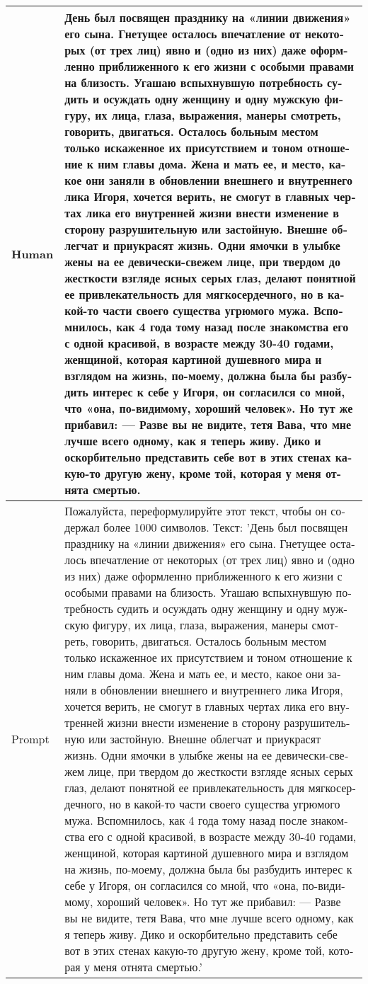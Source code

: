 \begin{center}
\begin{supertabular}{l | p{12cm}}
        Human & \foreignlanguage{russian}{День был посвящен празднику на «линии движения» его сына. Гнетущее осталось впечатление от некоторых (от трех лиц) явно и (одно из них) даже оформленно приближенного к его жизни с особыми правами на близость. Угашаю вспыхнувшую потребность судить и осуждать одну женщину и одну мужскую фигуру, их лица, глаза, выражения, манеры смотреть, говорить, двигаться. Осталось больным местом только искаженное их присутствием и тоном отношение к ним главы дома. Жена и мать ее, и место, какое они заняли в обновлении внешнего и внутреннего лика Игоря, хочется верить, не смогут в главных чертах лика его внутренней жизни внести изменение в сторону разрушительную или застойную. Внешне облегчат и приукрасят жизнь. Одни ямочки в улыбке жены на ее девически-свежем лице, при твердом до жесткости взгляде ясных серых глаз, делают понятной ее привлекательность для мягкосердечного, но в какой-то части своего существа угрюмого мужа. Вспомнилось, как 4 года тому назад после знакомства его с одной красивой, в возрасте между 30-40 годами, женщиной, которая картиной душевного мира и взглядом на жизнь, по-моему, должна была бы разбудить интерес к себе у Игоря, он согласился со мной, что «она, по-видимому, хороший человек». Но тут же прибавил: — Разве вы не видите, тетя Вава, что мне лучше всего одному, как я теперь живу. Дико и оскорбительно представить себе вот в этих стенах какую-то другую жену, кроме той, которая у меня отнята смертью.}\\ 
        \midrule
        Prompt & \foreignlanguage{russian}{Пожалуйста, переформулируйте этот текст, чтобы он содержал более 1000 символов. Текст: 'День был посвящен празднику на «линии движения» его сына. Гнетущее осталось впечатление от некоторых (от трех лиц) явно и (одно из них) даже оформленно приближенного к его жизни с особыми правами на близость. Угашаю вспыхнувшую потребность судить и осуждать одну женщину и одну мужскую фигуру, их лица, глаза, выражения, манеры смотреть, говорить, двигаться. Осталось больным местом только искаженное их присутствием и тоном отношение к ним главы дома. Жена и мать ее, и место, какое они заняли в обновлении внешнего и внутреннего лика Игоря, хочется верить, не смогут в главных чертах лика его внутренней жизни внести изменение в сторону разрушительную или застойную. Внешне облегчат и приукрасят жизнь. Одни ямочки в улыбке жены на ее девически-свежем лице, при твердом до жесткости взгляде ясных серых глаз, делают понятной ее привлекательность для мягкосердечного, но в какой-то части своего существа угрюмого мужа. Вспомнилось, как 4 года тому назад после знакомства его с одной красивой, в возрасте между 30-40 годами, женщиной, которая картиной душевного мира и взглядом на жизнь, по-моему, должна была бы разбудить интерес к себе у Игоря, он согласился со мной, что «она, по-видимому, хороший человек». Но тут же прибавил: — Разве вы не видите, тетя Вава, что мне лучше всего одному, как я теперь живу. Дико и оскорбительно представить себе вот в этих стенах какую-то другую жену, кроме той, которая у меня отнята смертью.'}\\

\end{supertabular}
\end{center}
